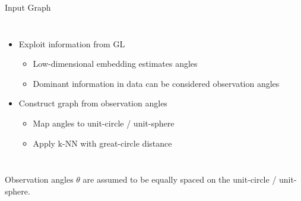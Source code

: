 \begin{frame}{Input Graph}
  \pause
  \begin{columns}
    \begin{itemize}
      \item Exploit information from GL
      \begin{itemize}
        \item Low-dimensional embedding estimates angles
        \item Dominant information in data can be considered observation angles
      \end{itemize}
      \item<3-> \alert<3>{Construct graph from observation angles}
      \begin{itemize}
        \item<4-> \alert<4>{Map angles to unit-circle / unit-sphere}
        \item<5-> \alert<5>{Apply k-NN with great-circle distance}
      \end{itemize}
    \end{itemize}


    
  \end{columns}
  

  \begin{tcolorbox}[colback=red!5!white,hide=<1-5>, alert=<6>, colframe=red!75!black]
    Observation angles $\theta$ are assumed to be equally spaced on the unit-circle / unit-sphere.
\end{tcolorbox}
\end{frame}

